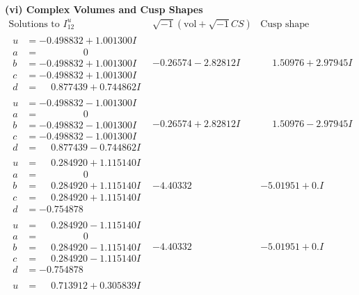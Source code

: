 \documentclass[1p]{elsarticle_modified}
\theoremstyle{definition}
\newcommand{\I}{\sqrt{-1}}
\begin{document}
\newpage\flushleft \textbf{(vi) Complex Volumes and Cusp Shapes}
$$\begin{array}{c|c|c}  
\text{Solutions to }I^u_{12}& \I (\text{vol} + \sqrt{-1}CS) & \text{Cusp shape}\\
 \hline 
\begin{aligned}
u &= -0.498832 + 1.001300 I \\
a &= \phantom{-0.000000 } 0 \\
b &= -0.498832 + 1.001300 I \\
c &= -0.498832 + 1.001300 I \\
d &= \phantom{-}0.877439 + 0.744862 I\end{aligned}
 & -0.26574 - 2.82812 I & \phantom{-}1.50976 + 2.97945 I \\ \hline\begin{aligned}
u &= -0.498832 - 1.001300 I \\
a &= \phantom{-0.000000 } 0 \\
b &= -0.498832 - 1.001300 I \\
c &= -0.498832 - 1.001300 I \\
d &= \phantom{-}0.877439 - 0.744862 I\end{aligned}
 & -0.26574 + 2.82812 I & \phantom{-}1.50976 - 2.97945 I \\ \hline\begin{aligned}
u &= \phantom{-}0.284920 + 1.115140 I \\
a &= \phantom{-0.000000 } 0 \\
b &= \phantom{-}0.284920 + 1.115140 I \\
c &= \phantom{-}0.284920 + 1.115140 I \\
d &= -0.754878\phantom{ +0.000000I}\end{aligned}
 & -4.40332\phantom{ +0.000000I} & -5.01951 + 0. I\phantom{ +0.000000I} \\ \hline\begin{aligned}
u &= \phantom{-}0.284920 - 1.115140 I \\
a &= \phantom{-0.000000 } 0 \\
b &= \phantom{-}0.284920 - 1.115140 I \\
c &= \phantom{-}0.284920 - 1.115140 I \\
d &= -0.754878\phantom{ +0.000000I}\end{aligned}
 & -4.40332\phantom{ +0.000000I} & -5.01951 + 0. I\phantom{ +0.000000I} \\ \hline\begin{aligned}
u &= \phantom{-}0.713912 + 0.305839 I \\

\end{aligned}
\end{array}$$
\end{document}
